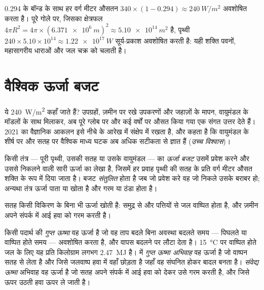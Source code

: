 \begin{example}[पृथ्वी द्वारा अवशोषित सूर्य-प्रकाश]\label{ex:g10:earth-energy-budget:absorbed}
0.294 के बॉन्ड  के साथ हर वर्ग मीटर औसतन $340
\times (1 - 0.294) \approx \qty{240}{W/m^2}$ अवशोषित करता है। पूरे गोले पर, जिसका
क्षेत्रफल $4\pi R^2 = 4\pi \times (\qty{6.371e6}{m})^2 \approx \qty{5.10e14}{m^2}$ है,
पृथ्वी $240 \times 5.10\times10^{14} \approx \qty{1.22e17}{W}$
सूर्य-प्रकाश अवशोषित करती है: यही शक्ति पवनों, महासागरीय धाराओं और जल
चक्र को चलाती है।
\end{example}

\section{वैश्विक ऊर्जा बजट}

ये \qty{240}{W/m^2} कहाँ जाते हैं? उपग्रहों, ज़मीन पर रखे उपकरणों और जहाज़ों के मापन,
वायुमंडल के मॉडलों के साथ मिलाकर, अब पूरे ग्लोब पर और कई वर्षों पर औसत किया गया एक
संगत उत्तर देते हैं। 2021 का वैज्ञानिक आकलन इसे नीचे के आरेख में संक्षेप में रखता है, और
कहता है कि वायुमंडल के शीर्ष पर और सतह पर वैश्विक माध्य घटक अब अधिक सटीकता से ज्ञात
हैं (\emph{उच्च
विश्वास})।

\begin{definition}[ऊर्जा बजट]\label{def:g10:earth-energy-budget:energy-budget}
किसी तंत्र --- पूरी पृथ्वी, उसकी सतह या उसके वायुमंडल --- का \emph{ऊर्जा बजट}
उसमें प्रवेश करने और उससे निकलने वाली सारी ऊर्जा का लेखा है, जिसमें हर प्रवाह
पृथ्वी की सतह के प्रति वर्ग मीटर औसत शक्ति के रूप में दिया जाता है। बजट \emph{संतुलित} होता
है जब जो प्रवेश करे वह जो निकले उसके बराबर हो; अन्यथा तंत्र ऊर्जा पाता या खोता है और गरम
या ठंडा होता है।
\end{definition}

सतह किसी विकिरण के बिना भी ऊर्जा खोती है: समुद्र से और पत्तियों से जल वाष्पित होता है, और
ज़मीन अपने संपर्क में आई हवा को गरम करती है।

\begin{definition}[गुप्त ऊष्मा; संवेद्य ऊष्मा]\label{def:g10:earth-energy-budget:latent-heat}
किसी पदार्थ की \emph{गुप्त ऊष्मा} वह ऊर्जा है जो वह ताप बदले बिना
अवस्था बदलते समय --- पिघलते या वाष्पित होते समय --- अवशोषित करता है, और वापस
बदलने पर लौटा देता है। \qty{15}{\degreeCelsius} पर वाष्पित होते जल के लिए यह प्रति
किलोग्राम लगभग \qty{2.47}{MJ} है।  में \emph{गुप्त ऊष्मा अभिवाह}
वह ऊर्जा है जो वाष्पन सतह से लेता है और जिसे जलवाष्प हवा में वहाँ छोड़ता है जहाँ
वह संघनित होकर बादल बनता है। \emph{संवेद्य ऊष्मा} अभिवाह
वह ऊर्जा है जो सतह अपने संपर्क में आई हवा को देकर उसे गरम करती है, और जिसे ऊपर उठती हवा
ऊपर ले जाती है।
\end{definition}

